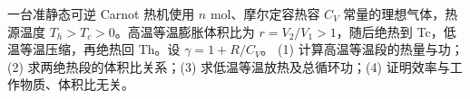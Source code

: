 一台准静态可逆 Carnot 热机使用 \(n\) mol、摩尔定容热容 \(C_V\) 常量的理想气体，热源温度 \(T_h>T_c>0\)。高温等温膨胀体积比为 \(r=V_2/V_1>1\)，随后绝热到 Tc，低温等温压缩，再绝热回 Th。设 \(\gamma=1+R/C_V\)。
(1) 计算高温等温段的热量与功；(2) 求两绝热段的体积比关系；(3) 求低温等温放热及总循环功；(4) 证明效率与工作物质、体积比无关。
